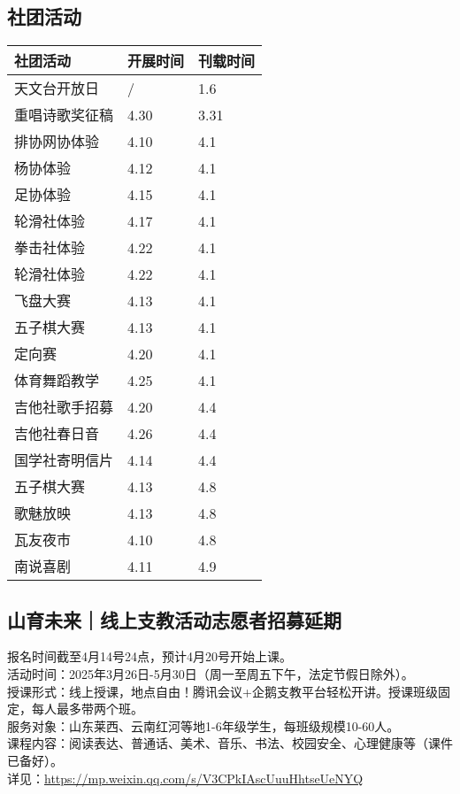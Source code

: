 \documentclass[letterpaper, 12pt]{article}
\begin{document}
\begin{multicols}{2}
\section{社团活动}
\begin{tabular}{|>{\centering\arraybackslash}m{}|m{}|m{}|}
    \hline
    社团活动 & 开展时间 & 刊载时间\\
    \hline\hline
    天文台开放日 & / & 1.6\\
    重唱诗歌奖征稿 & 4.30 & 3.31\\
    排协网协体验 & 4.10 & 4.1\\
    杨协体验 & 4.12 & 4.1\\
    足协体验 & 4.15 & 4.1\\
    轮滑社体验 & 4.17 & 4.1\\
    拳击社体验 & 4.22 & 4.1\\
    轮滑社体验 & 4.22 & 4.1\\
    飞盘大赛 & 4.13 & 4.1\\
    五子棋大赛 & 4.13 & 4.1\\
    定向赛 & 4.20 & 4.1\\
    体育舞蹈教学 & 4.25 & 4.1\\
    吉他社歌手招募 & 4.20 & 4.4\\
    吉他社春日音 & 4.26 & 4.4\\
    国学社寄明信片 & 4.14 & 4.4\\
    五子棋大赛 & 4.13 & 4.8\\
    歌魅放映 & 4.13 & 4.8\\
    瓦友夜市 & 4.10 & 4.8\\
    南说喜剧 & 4.11 & 4.9\\
    \hline
\end{tabular}
\subsection{山育未来｜线上支教活动志愿者招募延期}
报名时间截至4月14号24点，预计4月20号开始上课。\\
活动时间：2025年3月26日-5月30日（周一至周五下午，法定节假日除外）。
\\授课形式：线上授课，地点自由！腾讯会议+企鹅支教平台轻松开讲。授课班级固定，每人最多带两个班。
\\服务对象：山东莱西、云南红河等地1-6年级学生，每班级规模10-60人。
\\课程内容：阅读表达、普通话、美术、音乐、书法、校园安全、心理健康等（课件已备好）。
\\详见：\url{https://mp.weixin.qq.com/s/V3CPkIAscUuuHhtseUeNYQ}


\end{multicols}
\end{document}

